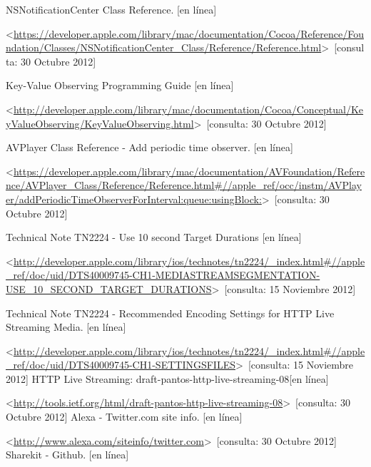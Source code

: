 
\begin{thebibliography}{99}
\begin{sloppypar}


%
%
NSNotificationCenter Class Reference. [en línea]\

\textless \url{https://developer.apple.com/library/mac/documentation/Cocoa/Reference/Foundation/Classes/NSNotificationCenter_Class/Reference/Reference.html}\textgreater \ [consulta: 30 Octubre 2012]

Key-Value Observing Programming Guide [en línea]\

\textless \url{http://developer.apple.com/library/mac/documentation/Cocoa/Conceptual/KeyValueObserving/KeyValueObserving.html}\textgreater \ [consulta: 30 Octubre 2012]

%
AVPlayer Class Reference - Add periodic time observer. [en línea]\

\textless \url{https://developer.apple.com/library/mac/documentation/AVFoundation/Reference/AVPlayer_Class/Reference/Reference.html\#//apple_ref/occ/instm/AVPlayer/addPeriodicTimeObserverForInterval:queue:usingBlock:}\textgreater \ [consulta: 30 Octubre 2012]


Technical Note TN2224 - Use 10 second Target Durations [en línea]\

\textless \url{http://developer.apple.com/library/ios/technotes/tn2224/_index.html\#//apple_ref/doc/uid/DTS40009745-CH1-MEDIASTREAMSEGMENTATION-USE_10_SECOND_TARGET_DURATIONS}\textgreater \ [consulta: 15 Noviembre 2012]

Technical Note TN2224 - Recommended Encoding Settings for HTTP Live Streaming Media. [en línea]\

\textless \url{http://developer.apple.com/library/ios/technotes/tn2224/_index.html\#//apple_ref/doc/uid/DTS40009745-CH1-SETTINGSFILES}\textgreater \ [consulta: 15 Noviembre 2012]
HTTP Live Streaming: draft-pantos-http-live-streaming-08[en línea]\

\textless \url{http://tools.ietf.org/html/draft-pantos-http-live-streaming-08}\textgreater \ [consulta: 30 Octubre 2012]
%
Alexa - Twitter.com site info. [en línea]\

\textless \url{http://www.alexa.com/siteinfo/twitter.com}\textgreater \ [consulta: 30 Octubre 2012] 
%
Sharekit - Github. [en línea]\


\end{sloppypar}
\end{thebibliography}
